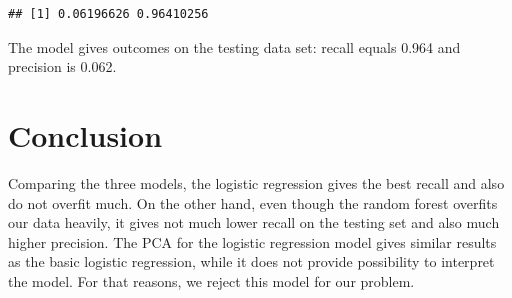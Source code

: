 \documentclass[
]{report}
\begin{document}
\begin{verbatim}
## [1] 0.06196626 0.96410256
\end{verbatim}

The model gives outcomes on the testing data set: recall equals 0.964
and precision is 0.062.

\hypertarget{conclusion}{%
\chapter{Conclusion}\label{conclusion}}

Comparing the three models, the logistic regression gives the best
recall and also do not overfit much. On the other hand, even though the
random forest overfits our data heavily, it gives not much lower recall
on the testing set and also much higher precision. The PCA for the
logistic regression model gives similar results as the basic logistic
regression, while it does not provide possibility to interpret the
model. For that reasons, we reject this model for our problem.
\end{document}
